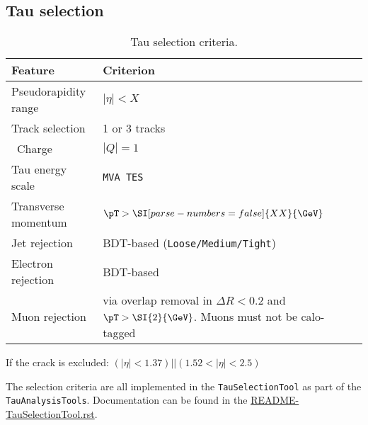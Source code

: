 \subsection{Tau selection}

\begin{table}[ht]
  \caption{Tau selection criteria.}%
  \label{tab:object:tau}
  \centering
  \begin{tabular}{ll}
  \toprule
  Feature & Criterion \\
  \midrule
  Pseudorapidity range & \(|\eta| < X\) \\
  Track selection & 1 or 3 tracks \\\
  Charge & \(|Q| = 1\) \\
  Tau energy scale & \texttt{MVA TES}\\
  Transverse momentum & \(\pT > \SI[parse-numbers=false]{XX}{\GeV}\) \\
  Jet rejection & BDT-based (\texttt{Loose/Medium/Tight}) \\
  Electron rejection & BDT-based\\
  Muon rejection & via overlap removal in \(\Delta R < 0.2\) and \(\pT > \SI{2}{\GeV}\).
    Muons must not be calo-tagged\\
  \bottomrule
  \end{tabular}
\end{table}

If the crack is excluded: \((|\eta| < 1.37) || (1.52 < |\eta| < 2.5)\)

The selection criteria are all implemented in the \texttt{TauSelectionTool} as part of the \texttt{TauAnalysisTools}.
Documentation can be found in the \href{https://gitlab.cern.ch/atlas/athena/blob/21.2/PhysicsAnalysis/TauID/TauAnalysisTools/doc/README-TauSelectionTool.rst}{README-TauSelectionTool.rst}.
